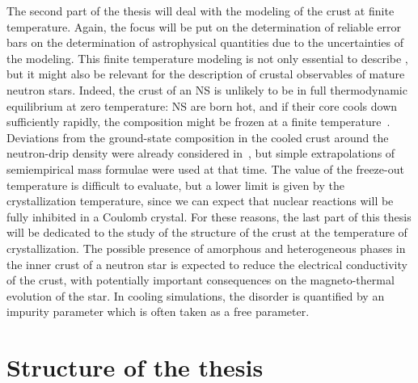 The second part of the thesis will deal with the modeling of the crust at 
finite temperature. Again, the focus will be put on the determination of 
reliable error bars on the determination of astrophysical quantities due to the 
uncertainties of the modeling. This finite temperature modeling is not only 
essential to describe , but it might also be 
relevant for the description of crustal observables of mature neutron stars. 
Indeed, the crust of an NS is unlikely to be in full thermodynamic equilibrium 
at zero temperature: NS are born hot, and if their core cools 
down sufficiently rapidly, the composition might be frozen at a finite 
temperature~\cite{Goriely2011}. 
Deviations from the ground-state composition in the cooled crust around the 
neutron-drip density were already considered in~\cite{Bisnovaty1979}, but 
simple extrapolations of semiempirical mass formulae were used at that time. 
The value of the freeze-out temperature is difficult to evaluate, but a lower 
limit is given by the crystallization temperature, since we can expect that 
nuclear reactions will be fully inhibited in a Coulomb crystal. 
For these reasons, the last part of this thesis will be dedicated to the study 
of the structure of the crust at the temperature of crystallization. 
The possible presence of amorphous and heterogeneous phases in the inner crust 
of a neutron star is expected to reduce the electrical conductivity of the 
crust, with potentially important consequences on the magneto-thermal evolution 
of the star.  In cooling simulations, the disorder is quantified by an impurity 
parameter which is often taken as a free parameter. 

\section*{Structure of the thesis}

